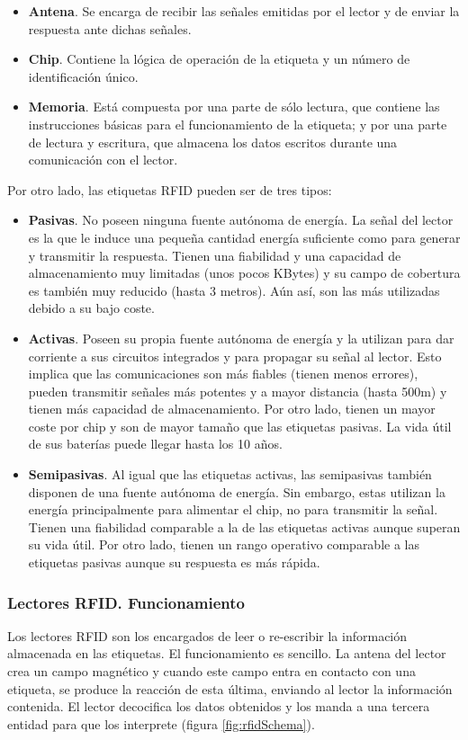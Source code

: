   \begin{itemize}
    \item \textbf{Antena}. Se encarga de recibir las señales emitidas por el
  lector y de enviar la respuesta ante dichas señales.
    \item \textbf{Chip}. Contiene la lógica de operación de la etiqueta y un
  número de identificación único.
    \item \textbf{Memoria}. Está compuesta por una parte de sólo lectura,
  que contiene las instrucciones básicas para el funcionamiento de la etiqueta;
  y por una parte de lectura y escritura, que almacena los datos escritos
  durante una comunicación con el lector.
  \end{itemize}
  
  Por otro lado, las etiquetas \ac{RFID} pueden ser de tres tipos:
  \begin{itemize}
    \item \textbf{Pasivas}. No poseen ninguna fuente autónoma de energía. La
  señal del lector es la que le induce una pequeña cantidad energía suficiente 
  como para generar y transmitir la respuesta. Tienen una fiabilidad y una
  capacidad de almacenamiento muy limitadas (unos pocos KBytes) y su campo de
  cobertura es también muy reducido (hasta 3 metros). Aún así, son las más
  utilizadas debido a su bajo coste.
   \item \textbf{Activas}. Poseen su propia fuente autónoma de energía y la
  utilizan para dar corriente a sus circuitos integrados y para propagar su
  señal al lector. Esto implica que las comunicaciones son más fiables (tienen
  menos errores), pueden transmitir señales más potentes y a mayor distancia
  (hasta 500m) y tienen más capacidad de almacenamiento. Por otro lado, tienen
  un mayor coste por chip y son de mayor tamaño que las etiquetas pasivas. La
  vida útil de sus baterías puede llegar hasta los 10 años.
    \item \textbf{Semipasivas}. Al igual que las etiquetas activas, las
  semipasivas también disponen de una fuente autónoma de energía. Sin embargo,
  estas utilizan la energía principalmente para alimentar el chip, no para
  transmitir la señal. Tienen una fiabilidad comparable a la de las etiquetas
  activas aunque superan su vida útil. Por otro lado, tienen un rango
  operativo comparable a las etiquetas pasivas aunque su respuesta es más
  rápida.
  \end{itemize}

    \subsubsection{Lectores RFID. Funcionamiento}
  Los lectores \acs{RFID} son los encargados de leer o re-escribir la
  información almacenada en las etiquetas.
  El funcionamiento es sencillo. La antena del lector crea un campo magnético
  y cuando este campo entra en contacto con una etiqueta, se produce la
  reacción de esta última, enviando al lector la información contenida.
  El lector decocifica los datos obtenidos y los manda a una tercera entidad 
  para que los interprete (figura \ref{fig:rfidSchema}).

